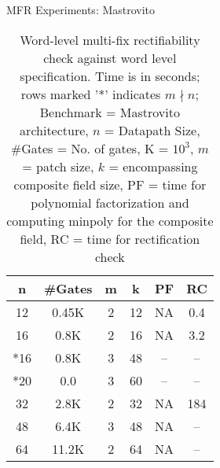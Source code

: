 \begin{frame}{\large MFR Experiments: Mastrovito}

{\small
\begin{table}[]
\centering
\caption{{\footnotesize Word-level multi-fix rectifiability check against word level specification. Time is in seconds; rows marked '*' indicates $m \nmid n$; Benchmark = Mastrovito architecture, $n$ = Datapath Size, \#Gates = No. of gates, K = $10^3$, $m$ = patch size, $k$ = encompassing composite field size, PF = time for polynomial factorization and computing minpoly for the composite field, RC = time for rectification check}}
\label{masusmontspec}
\begin{tabular}{| c | c | c | c | c | c |} \hline
{\textbf{n}}& {\textbf{\#Gates}} & {\textbf{m}} & {\textbf{k}} & {\textbf{PF}} & {\textbf{RC}} \\ \hline 
12  & 0.45K & 2 & 12  & NA & 0.4\\ \hline
16  & 0.8K & 2 & 16  & NA & 3.2 \\ \hline
*16 & 0.8K & 3 & 48  & -- & --  \\ \hline
*20 & 0.0 & 3 & 60  & -- & --   \\ \hline
32  & 2.8K & 2 & 32  & NA & 184 \\ \hline
48  & 6.4K & 3 & 48  & NA & --  \\ \hline
64  & 11.2K & 2 & 64  & NA & -- \\ \hline
\end{tabular}
\end{table}}

\end{frame}



